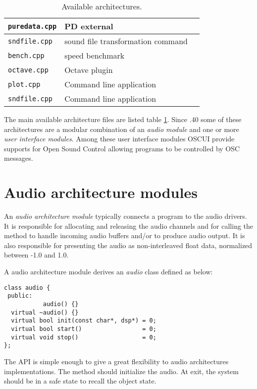 \begin{table}[htdp]
\begin{center}
\begin{tabular}{|l|l|l|}
\texttt{puredata.cpp} 		& PD external  \\
\hline
\texttt{sndfile.cpp} 		& sound file transformation command \\
\texttt{bench.cpp} 			& speed benchmark   \\
\texttt{octave.cpp} 		& Octave plugin   \\
\texttt{plot.cpp} 			& Command line application    \\
\texttt{sndfile.cpp} 		& Command line application    \\
\hline
\end{tabular}
\end{center}
\caption{Available architectures.}
\label{tab:availablearch}
\end{table}%


The main available architecture files are listed table \ref{tab:availablearch}. Since .40 some of these architectures are a modular combination of an \emph{audio module} and one or more \emph{user interface modules}. Among these user interface modules OSCUI provide supports for Open Sound Control allowing \faust programs to be controlled by OSC messages. 

\section{Audio architecture modules} 
An \emph{audio architecture module} typically connects a \faust program to the audio drivers.
It is responsible for allocating and releasing the audio channels and for calling the \faust {} method to handle incoming audio buffers and/or to produce audio output. It is also responsible for presenting the audio as non-interleaved float data, normalized between -1.0 and 1.0.

A \faust audio architecture module derives an \emph{audio} class defined as below:
\begin{lstlisting}[basicstyle=\ttfamily\footnotesize\color{yotxt}]
class audio {
 public:
           audio() {}
  virtual ~audio() {}
  virtual bool init(const char*, dsp*) = 0;
  virtual bool start()                 = 0;
  virtual void stop()                  = 0;
};
\end{lstlisting} 


The API is simple enough to give a great flexibility to audio architectures implementations. The  method should initialize the audio. At  exit, the system should be in a safe state to recall the  object state.

